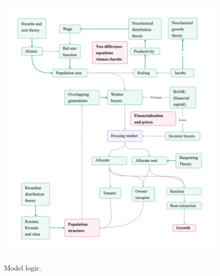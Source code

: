 \begin{figure}  %
\vspace{-3.5cm}
\begin{adjustwidth}{-0.24\textwidth}{-0.24\textwidth}
\centering
\includegraphics[scale=.35]{fig/flow_full_model.png}%
\label{Stylized model flow.}
\end{adjustwidth}
\caption[Model logic]{Model logic.}\label{fig-flow-full-model}

\end{figure}

